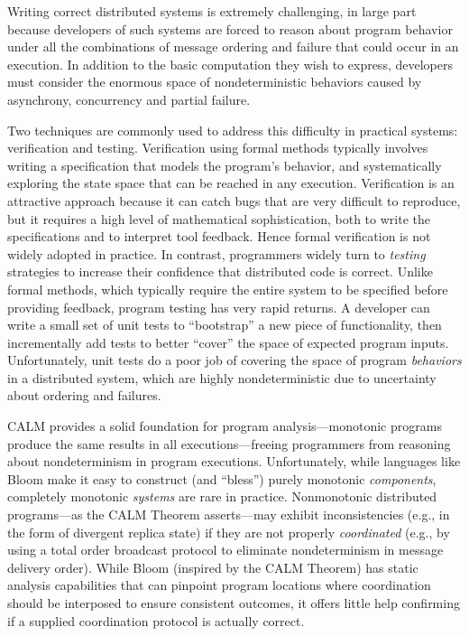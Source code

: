 
Writing correct distributed systems is extremely challenging, in large part
because developers of such systems are forced to reason
about program behavior under all the combinations of message ordering and failure
that could occur in an execution.
In addition to the basic computation they wish to express, developers
must consider the enormous space of nondeterministic behaviors caused by 
asynchrony, concurrency and partial failure.

Two techniques are commonly used
to address this difficulty in practical systems: verification and testing.
Verification using formal methods typically involves writing a specification
that models the program's behavior, and systematically exploring the state 
space that can be reached in any execution.  Verification is an attractive 
approach because it can catch bugs that are very difficult to reproduce,
but it requires a high level of mathematical sophistication, both to write the 
specifications and to interpret tool feedback.
Hence formal verification is not widely adopted in practice.  
In contrast, programmers widely turn to \emph{testing} strategies to increase
their confidence that distributed code is correct.  Unlike formal methods, 
which typically require the entire system to be specified before providing 
feedback, program testing has very rapid returns.  A developer can write a 
small set of unit tests to ``bootstrap'' a new piece of functionality, then
incrementally add tests to better ``cover'' the space of expected program 
inputs.  Unfortunately, unit tests do a poor job of covering the space of
program \emph{behaviors} in a distributed system, which are highly
nondeterministic due to uncertainty about ordering and failures.

CALM provides a solid foundation for program analysis---monotonic programs
produce the same results in all executions---freeing programmers from reasoning
about nondeterminism in program executions.  Unfortunately, while languages
like Bloom make it easy to construct (and ``bless'') purely monotonic 
\emph{components}, completely monotonic \emph{systems} are rare in practice.
Nonmonotonic distributed programs---as the CALM Theorem asserts---may exhibit
inconsistencies (e.g., in the form of divergent replica state)
if they are not
properly \emph{coordinated} (e.g., by using a total order broadcast protocol
to eliminate nondeterminism in message delivery order).
While Bloom (inspired by the CALM Theorem) has static analysis capabilities
that can pinpoint program locations where coordination should be interposed
to ensure consistent outcomes, it offers little help confirming if a supplied
coordination protocol is actually correct.

